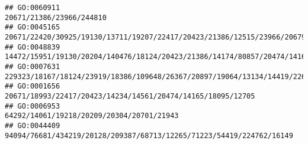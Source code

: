 \documentclass[
]{article}
\begin{document}
\begin{verbatim}
## GO:0060911                                                                                                                                                                                                                                                                                                                                                                                     20671/21386/23966/244810
## GO:0045165                                                                                                                                                                                                                                                                                    20671/22420/30925/19130/13711/19207/22417/20423/21386/12515/23966/20679/14234/244810/15110/217721/16364/14165/21380/20371
## GO:0048839                                                                                                                                                                                                                                                                                                      14472/15951/19130/20204/140476/18124/20423/21386/14174/80857/20474/14165/21380/14972/14998/15024/224796
## GO:0007631                                                                                                                                                                                                                                                                                                                                   229323/18167/18124/23919/18386/109648/26367/20897/19064/13134/14419/226278
## GO:0001656                                                                                                                                                                                                                                                                                                                                                  20671/18993/22417/20423/14234/14561/20474/14165/18095/12705
## GO:0006953                                                                                                                                                                                                                                                                                                                                                                    64292/14061/19218/20209/20304/20701/21943
## GO:0044409                                                                                                                                                                                                                                                                                                                                         94094/76681/434219/20128/209387/68713/12265/71223/54419/224762/16149

\end{verbatim}
\end{document}
